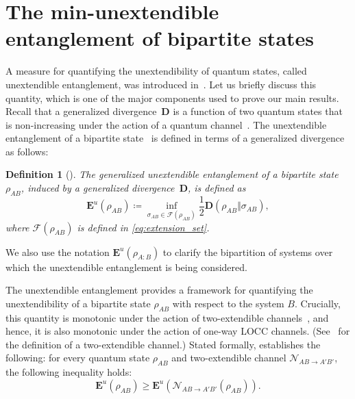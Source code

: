 \documentclass[twocolumn,letterpaper, dvipsnames,allowtoday, accepted = 2025-12-31]{quantumarticle}
\newtheorem{definition}{Definition}
\begin{document}
\section{The min-unextendible entanglement of bipartite states}\label{app:min_unext_ent}

A measure for quantifying the unextendibility of quantum states, called unextendible entanglement, was introduced in~\cite{WWW21}. Let us briefly discuss this quantity, which is one of the major components used to prove our main results. Recall that a generalized divergence~$\mathbf{D}$ is a function of two quantum states that is non-increasing under the action of a quantum channel~\cite{polyanskiy2010arimoto}. The unextendible entanglement of a bipartite  state~\cite{WWW21} is defined in terms of a generalized divergence as follows:

\begin{definition}[\cite{WWW21}]
\label{def:unext-ent}
    The generalized unextendible entanglement of a bipartite state $\rho_{AB}$, induced by a generalized divergence~$\mathbf{D}$, is defined as
        \begin{equation}
        \label{eq:gen_unext_ent_states}
        \mathbf{E}^u(\rho_{AB}) \coloneqq  \inf_{\sigma_{AB}\in \mathcal{F}\left(\rho_{AB}\right)} \frac{1}{2} \mathbf{D}\!\left(\rho_{AB}\Vert\sigma_{AB}\right),
    \end{equation}    
    where $\mathcal{F}\!\left(\rho_{AB}\right)$ is defined in \eqref{eq:extension_set}. 
\end{definition}

We also use the notation $\mathbf{E}^u\!\left(\rho_{A:B}\right)$ to clarify the bipartition of systems over which the unextendible entanglement is being considered.

The unextendible entanglement provides a framework for quantifying the unextendibility of a bipartite state $\rho_{AB}$ with respect to the system $B$. Crucially, this quantity is monotonic under the action of two-extendible channels~\cite[Theorem~2]{WWW21}, and hence, it is also monotonic under the action of one-way LOCC channels. (See~\cite{KDWW19,KDWW21,WWW21} for the definition of a two-extendible channel.) Stated formally, \cite[Theorem~2]{WWW21} establishes the following: for every quantum state $\rho_{AB}$ and two-extendible channel $\mathcal{N}_{AB\to A'B'}$, the following inequality holds:
    \begin{equation}
        \mathbf{E}^u(\rho_{AB}) \ge \mathbf{E}^u(\mathcal{N}_{AB\to A'B'}\!\left(\rho_{AB}\right)) .
        \label{eq:unext-ent-monotone-WWW21}
    \end{equation}
\end{document}
